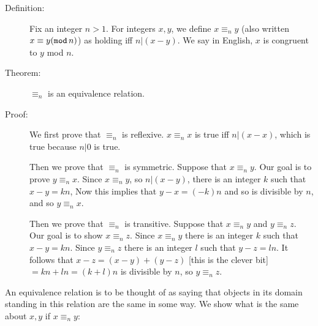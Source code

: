 \documentclass[12pt]{article}
\begin{document}
\begin{description}

\item[Definition:]  Fix an integer $n>1$.  For integers $x,y$, we define $x \equiv_n y$ (also written $x \equiv y ({\tt mod}\,n)$) as
holding iff $n|(x-y)$.  We say in English, $x$ is congruent to $y$ mod $n$.

\item[Theorem:]  $\equiv_n$ is an equivalence relation.

\item[Proof:]  We first prove that $\equiv_n$ is reflexive.  $x \equiv_n x$ is true iff $n|(x-x)$, which is true because $n|0$ is true.

Then we prove that $\equiv_n$ is symmetric.  Suppose that $x \equiv_n y$.  Our goal is to prove $y \equiv_n x$.
Since $x \equiv_n y$, so $n|(x-y)$, there is an integer $k$ such that $x-y = kn$,  Now this implies that $y-x = (-k)n$ and so is divisible by $n$, and so $y \equiv_n x$.

Then we prove that $\equiv_n$ is transitive.  Suppose that $x \equiv_n y$ and $y \equiv_n z$.  Our goal is to show
$x \equiv_n z$.  Since $x \equiv_n y$ there is an integer $k$ such that $x-y=kn$. Since $y \equiv_n z$ there is an integer $l$ such that $y-z=ln$.   It follows that $x-z = (x-y)+(y-z)$ [this is the clever bit] $= kn + ln = (k+l)n$ is divisible by $n$, so $y \equiv_n z$.

\end{description}

An equivalence relation is to be thought of as saying that objects in its domain standing in this relation are the same in some way.  We show what is the same about $x,y$ if $x \equiv_n y$:
\end{document}
